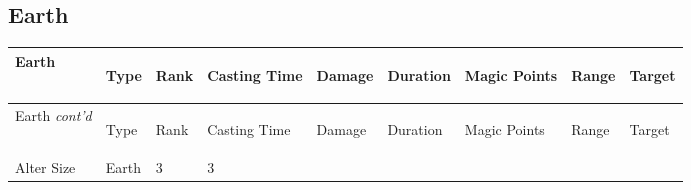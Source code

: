 \documentclass[twoside]{book}
\begin{document}
    

\subsection{Earth}
    
\begin{longtable}{p{1.25in}lp{2em}p{3em}llp{7em}ll} 
  Earth& \begin{turn}{70}{Type}\end{turn}
          & \begin{turn}{70}{Rank}\end{turn}
          & \begin{turn}{70}{Casting Time}\end{turn}
          & \begin{turn}{70}{Damage}\end{turn}
          & \begin{turn}{70}{Duration}\end{turn}
          & \begin{turn}{70}{Magic Points}\end{turn}
          & \begin{turn}{70}{Range}\end{turn}
          & \begin{turn}{70}{Target}\end{turn}
          \\
  \hline
  \hline
  \endfirsthead
  Earth \textit{cont'd}
        & \begin{turn}{70}{Type}\end{turn}
          & \begin{turn}{70}{Rank}\end{turn}
          & \begin{turn}{70}{Casting Time}\end{turn}
          & \begin{turn}{70}{Damage}\end{turn}
          & \begin{turn}{70}{Duration}\end{turn}
          & \begin{turn}{70}{Magic Points}\end{turn}
          & \begin{turn}{70}{Range}\end{turn}
          & \begin{turn}{70}{Target}\end{turn}
           \\
  \hline
  \endhead
\raggedright Alter Size & Earth & 3 & 3

\end{longtable}
\end{document}
